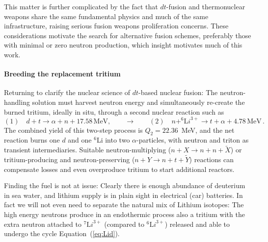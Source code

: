\documentclass[particles,article,accept,pdftex,moreauthors]{Definitions/mdpi}
\newcommand{\req}[1]{Equation~(\ref{#1})}
\begin{document}
This matter is further complicated by the fact that $dt$-fusion and thermonuclear weapons share the same fundamental physics and much of the same infrastructure, raising serious fusion weapons proliferation concerns. These considerations motivate the search for alternative fusion schemes, preferably those with minimal or zero neutron production, which insight motivates much of this work.

\paragraph*{\bf Breeding the replacement tritium}
Returning to clarify the nuclear science of $dt$-based nuclear fusion: The neutron-handling solution must harvest neutron energy and simultaneously re-create the burned tritium, ideally in situ, through a second nuclear reaction such as
\begin{equation}\label{eq:Lid}
(1)\quad d+t\to \alpha +n +17.58\,\mathrm{MeV}, \qquad\to \qquad (2)\quad n+^{6\!}{\mathrm Li}^{3+}\to t +\alpha + 4.78\,\mathrm{MeV}\,.
\end{equation}
The combined yield of this two-step process is $Q_2=22.36$~MeV, and the net reaction burns one $d$ and one ${}^6$Li into two $\alpha$-particles, with neutron and triton as transient intermediaries. Suitable neutron-multiplying ($n+X\to n+n+\tilde X$) or tritium-producing and neutron-preserving ($n+Y\to n+t+\tilde Y$) reactions can compensate losses and even overproduce tritium to start additional reactors. 

Finding the fuel is not at issue: Clearly there is enough abundance of deuterium in sea water, and lithium supply is in plain sight in electrical (car) batteries. In fact we will not even need to separate the natural mix of Lithium isotopes: The high energy neutrons produce in an endothermic process also a tritium with the extra neutron attached to $^{7\!}{\mathrm Li}^{3+}$ (compared to $^{6\!}{\mathrm Li}^{3+}$) released and able to undergo the cycle \req{eq:Lid}.
\end{document}
